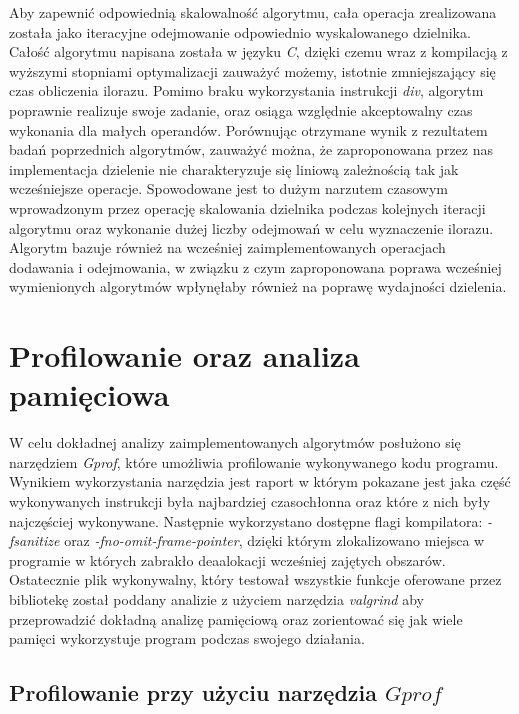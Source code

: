 \documentclass{article}
\begin{document}
\vspace{5mm}

Aby zapewnić odpowiednią skalowalność algorytmu, cała operacja zrealizowana została jako iteracyjne odejmowanie odpowiednio wyskalowanego dzielnika. Całość algorytmu napisana została w języku \textit{C}, dzięki czemu wraz z kompilacją z wyższymi stopniami optymalizacji zauważyć możemy, istotnie zmniejszający się czas obliczenia ilorazu. Pomimo braku wykorzystania instrukcji \textit{div}, algorytm poprawnie realizuje swoje zadanie, oraz osiąga względnie akceptowalny czas wykonania dla małych operandów. Porównując otrzymane wynik z rezultatem badań poprzednich algorytmów, zauważyć można, że zaproponowana przez nas implementacja dzielenie nie charakteryzuje się liniową zależnością tak jak wcześniejsze operacje. Spowodowane jest to dużym narzutem czasowym wprowadzonym przez operację skalowania dzielnika podczas kolejnych iteracji algorytmu oraz wykonanie dużej liczby odejmowań w celu wyznaczenie ilorazu. Algorytm bazuje również na wcześniej zaimplementowanych operacjach dodawania i odejmowania, w związku z czym zaproponowana poprawa wcześniej wymienionych algorytmów wpłynęłaby również na poprawę wydajności dzielenia.

\newpage{}

\section{Profilowanie oraz analiza pamięciowa}

W celu dokładnej analizy zaimplementowanych algorytmów posłużono się narzędziem \textit{Gprof}, które umożliwia profilowanie wykonywanego kodu programu. Wynikiem wykorzystania narzędzia jest raport w którym pokazane jest jaka część wykonywanych instrukcji była najbardziej czasochłonna oraz które z nich były najczęściej wykonywane. Następnie wykorzystano dostępne flagi kompilatora: \textit{-fsanitize} oraz \textit{-fno-omit-frame-pointer}, dzięki którym zlokalizowano miejsca w programie w których zabrakło deaalokacji wcześniej zajętych obszarów. Ostatecznie plik wykonywalny, który testował wszystkie funkcje oferowane przez bibliotekę został poddany analizie z użyciem narzędzia \textit{valgrind} aby przeprowadzić dokładną analizę pamięciową oraz zorientować się jak wiele pamięci wykorzystuje program podczas swojego działania. 

\subsection{Profilowanie przy użyciu narzędzia $Gprof$}
\end{document}

